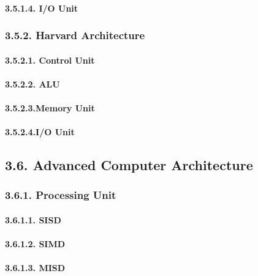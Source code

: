 \documentclass[]{article}
\let\oldparagraph\paragraph
\renewcommand{\paragraph}[1]{\oldparagraph{#1}\mbox{}}
\begin{document}
\paragraph{3.5.1.4. I/O Unit}\label{io-unit}

\subsubsection{3.5.2. Harvard Architecture}\label{harvard-architecture}

\paragraph{3.5.2.1. Control Unit}\label{control-unit-1}

\paragraph{3.5.2.2. ALU}\label{alu-1}

\paragraph{3.5.2.3.Memory Unit}\label{memory-unit-1}

\paragraph{3.5.2.4.I/O Unit}\label{io-unit-1}

\subsection{3.6. Advanced Computer
Architecture}\label{advanced-computer-architecture}

\subsubsection{3.6.1. Processing Unit}\label{processing-unit}

\paragraph{3.6.1.1. SISD}\label{sisd}

\paragraph{3.6.1.2. SIMD}\label{simd}

\paragraph{3.6.1.3. MISD}\label{misd}
\end{document}
